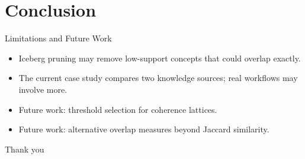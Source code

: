 \section{Conclusion}

\begin{frame}{Limitations and Future Work}
\begin{itemize}
    \item Iceberg pruning may remove low-support concepts that could overlap exactly.
    \item The current case study compares two knowledge sources; real workflows may involve more.
    \item Future work: threshold selection for coherence lattices.
    \item Future work: alternative overlap measures beyond Jaccard similarity.
\end{itemize}
\end{frame}

\begin{frame}
\centering
\Huge
Thank you
\end{frame}
